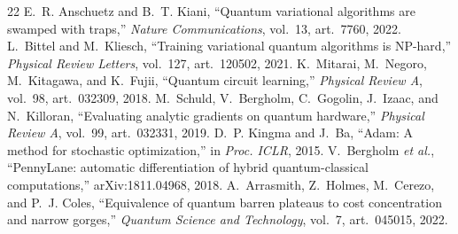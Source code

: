 \documentclass[conference]{IEEEtran}%
\begin{document}
\begin{thebibliography}{22}
 E.~R. Anschuetz and B.~T. Kiani, ``Quantum variational algorithms are swamped with traps,'' \emph{Nature Communications}, vol.~13, art.~7760, 2022.
 L.~Bittel and M.~Kliesch, ``Training variational quantum algorithms is NP-hard,'' \emph{Physical Review Letters}, vol.~127, art.~120502, 2021.
 K.~Mitarai, M.~Negoro, M.~Kitagawa, and K.~Fujii, ``Quantum circuit learning,'' \emph{Physical Review A}, vol.~98, art.~032309, 2018.
 M.~Schuld, V.~Bergholm, C.~Gogolin, J.~Izaac, and N.~Killoran, ``Evaluating analytic gradients on quantum hardware,'' \emph{Physical Review A}, vol.~99, art.~032331, 2019.
 D.~P. Kingma and J.~Ba, ``Adam: A method for stochastic optimization,'' in \emph{Proc. ICLR}, 2015.
 V.~Bergholm \emph{et al.}, ``PennyLane: automatic differentiation of hybrid quantum-classical computations,'' arXiv:1811.04968, 2018.
 A.~Arrasmith, Z.~Holmes, M.~Cerezo, and P.~J. Coles, ``Equivalence of quantum barren plateaus to cost concentration and narrow gorges,'' \emph{Quantum Science and Technology}, vol.~7, art.~045015, 2022.
\end{thebibliography}
\end{document}
